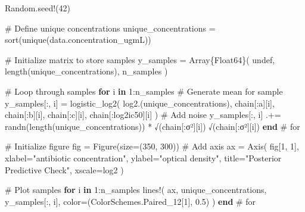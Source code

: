 \documentclass[
]{scrartcl}
\newenvironment{Shaded}{\begin{snugshade}}{\end{snugshade}}
\newcommand{\BuiltInTok}[1]{\textcolor[rgb]{0.00,0.23,0.31}{#1}}
\newcommand{\CommentTok}[1]{\textcolor[rgb]{0.37,0.37,0.37}{#1}}
\newcommand{\ConstantTok}[1]{\textcolor[rgb]{0.56,0.35,0.01}{#1}}
\newcommand{\ControlFlowTok}[1]{\textcolor[rgb]{0.00,0.23,0.31}{\textbf{#1}}}
\newcommand{\DataTypeTok}[1]{\textcolor[rgb]{0.68,0.00,0.00}{#1}}
\newcommand{\FloatTok}[1]{\textcolor[rgb]{0.68,0.00,0.00}{#1}}
\newcommand{\FunctionTok}[1]{\textcolor[rgb]{0.28,0.35,0.67}{#1}}
\newcommand{\KeywordTok}[1]{\textcolor[rgb]{0.00,0.23,0.31}{\textbf{#1}}}
\newcommand{\NormalTok}[1]{\textcolor[rgb]{0.00,0.23,0.31}{#1}}
\newcommand{\OperatorTok}[1]{\textcolor[rgb]{0.37,0.37,0.37}{#1}}
\newcommand{\StringTok}[1]{\textcolor[rgb]{0.13,0.47,0.30}{#1}}
\begin{document}
\begin{Shaded}
\begin{Highlighting}[]
\BuiltInTok{Random}\NormalTok{.}\FunctionTok{seed!}\NormalTok{(}\FloatTok{42}\NormalTok{)}

\CommentTok{\# Define unique concentrations}
\NormalTok{unique\_concentrations }\OperatorTok{=} \FunctionTok{sort}\NormalTok{(}\FunctionTok{unique}\NormalTok{(data.concentration\_ugmL))}

\CommentTok{\# Initialize matrix to store samples}
\NormalTok{y\_samples }\OperatorTok{=} \FunctionTok{Array}\DataTypeTok{\{Float64\}}\NormalTok{(}
    \ConstantTok{undef}\NormalTok{, }\FunctionTok{length}\NormalTok{(unique\_concentrations), n\_samples}
\NormalTok{)}

\CommentTok{\# Loop through samples}
\ControlFlowTok{for}\NormalTok{ i }\KeywordTok{in} \FloatTok{1}\OperatorTok{:}\NormalTok{n\_samples}
    \CommentTok{\# Generate mean for sample}
\NormalTok{    y\_samples[}\OperatorTok{:}\NormalTok{, i] }\OperatorTok{=} \FunctionTok{logistic\_log2}\NormalTok{(}
        \FunctionTok{log2}\NormalTok{.(unique\_concentrations),}
\NormalTok{        chain[}\OperatorTok{:}\NormalTok{a][i],}
\NormalTok{        chain[}\OperatorTok{:}\NormalTok{b][i],}
\NormalTok{        chain[}\OperatorTok{:}\NormalTok{c][i],}
\NormalTok{        chain[}\OperatorTok{:}\NormalTok{log2ic50][i]}
\NormalTok{    )}
    \CommentTok{\# Add noise}
\NormalTok{    y\_samples[}\OperatorTok{:}\NormalTok{, i] }\OperatorTok{.+=} \FunctionTok{randn}\NormalTok{(}\FunctionTok{length}\NormalTok{(unique\_concentrations)) }\OperatorTok{*} \FunctionTok{√}\NormalTok{(chain[}\OperatorTok{:}\NormalTok{σ²][i])}
    \FunctionTok{√}\NormalTok{(chain[}\OperatorTok{:}\NormalTok{σ²][i])}
\ControlFlowTok{end} \CommentTok{\# for}

\CommentTok{\# Initialize figure}
\NormalTok{fig }\OperatorTok{=} \FunctionTok{Figure}\NormalTok{(size}\OperatorTok{=}\NormalTok{(}\FloatTok{350}\NormalTok{, }\FloatTok{300}\NormalTok{))}
\CommentTok{\# Add axis}
\NormalTok{ax }\OperatorTok{=} \FunctionTok{Axis}\NormalTok{(}
\NormalTok{    fig[}\FloatTok{1}\NormalTok{, }\FloatTok{1}\NormalTok{],}
\NormalTok{    xlabel}\OperatorTok{=}\StringTok{"antibiotic concentration"}\NormalTok{,}
\NormalTok{    ylabel}\OperatorTok{=}\StringTok{"optical density"}\NormalTok{,}
\NormalTok{    title}\OperatorTok{=}\StringTok{"Posterior Predictive Check"}\NormalTok{,}
\NormalTok{    xscale}\OperatorTok{=}\NormalTok{log2}
\NormalTok{)}

\CommentTok{\# Plot samples}
\ControlFlowTok{for}\NormalTok{ i }\KeywordTok{in} \FloatTok{1}\OperatorTok{:}\NormalTok{n\_samples}
    \FunctionTok{lines!}\NormalTok{(}
\NormalTok{        ax,}
\NormalTok{        unique\_concentrations,}
\NormalTok{        y\_samples[}\OperatorTok{:}\NormalTok{, i],}
\NormalTok{        color}\OperatorTok{=}\NormalTok{(ColorSchemes.Paired\_12[}\FloatTok{1}\NormalTok{], }\FloatTok{0.5}\NormalTok{)}
\NormalTok{    )}
\ControlFlowTok{end} \CommentTok{\# for}


\end{Highlighting}
\end{Shaded}
\end{document}
